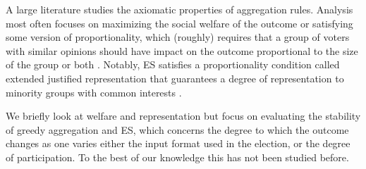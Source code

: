 \documentclass[letterpaper]{article} %
\newcommand{\kibitz}[2]{\ifnum\Comments=1{\color{#1}{#2}}\fi}
\newcommand{\gb}[1]{\kibitz{brown}{[GB:#1]}}
\newcommand{\mes}{ES}
\begin{document}
A large literature studies the axiomatic properties of aggregation rules. Analysis most often focuses on maximizing the social welfare of the outcome \cite{benade2021preference,goel2019knapsack,jain2020participatory,hershkowitz2021district,talmon2019framework} \gb{other papers that maximize welfare?} %
or satisfying some version of proportionality, which (roughly) requires that a group of voters  with similar opinions should have impact on the outcome proportional to the size of the group \cite{fain2016core,  aziz2017justified, sanchez2017proportional, fain2018fair, aziz2018proportionally, skowron2020participatory, peters2021proportional} or both \cite{fairstein2022welfare,michorzewski2020price}.  Notably, \mes{} satisfies a proportionality condition called extended justified representation that guarantees a degree of representation to minority groups with common interests \citep{PS20}. 


We briefly look at welfare and representation but focus on evaluating  the stability of greedy aggregation and \mes{}, which  concerns the degree to which the outcome changes as one varies either the input format used in the election, or the degree of participation.  To the best of our knowledge this has not been studied before. 
\end{document}
